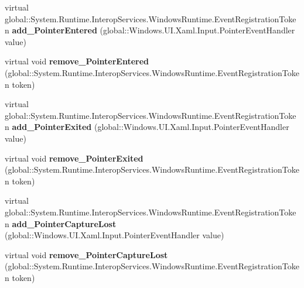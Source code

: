 \begin{DoxyCompactItemize}
\mbox{\label{class_windows_1_1_u_i_1_1_xaml_1_1_u_i_element_a62b58e40180ca9bf1db42ed2d6038c28}} 
virtual global\+::\+System.\+Runtime.\+Interop\+Services.\+Windows\+Runtime.\+Event\+Registration\+Token {\bfseries add\+\_\+\+Pointer\+Entered} (global\+::\+Windows.\+U\+I.\+Xaml.\+Input.\+Pointer\+Event\+Handler value)
\item 
\mbox{\label{class_windows_1_1_u_i_1_1_xaml_1_1_u_i_element_a7f81753f2c0c006e2fa7fc60206ef8fe}} 
virtual void {\bfseries remove\+\_\+\+Pointer\+Entered} (global\+::\+System.\+Runtime.\+Interop\+Services.\+Windows\+Runtime.\+Event\+Registration\+Token token)
\item 
\mbox{\label{class_windows_1_1_u_i_1_1_xaml_1_1_u_i_element_add2a4b911cb6783842ef779b81b58824}} 
virtual global\+::\+System.\+Runtime.\+Interop\+Services.\+Windows\+Runtime.\+Event\+Registration\+Token {\bfseries add\+\_\+\+Pointer\+Exited} (global\+::\+Windows.\+U\+I.\+Xaml.\+Input.\+Pointer\+Event\+Handler value)
\item 
\mbox{\label{class_windows_1_1_u_i_1_1_xaml_1_1_u_i_element_a0371add03a51f168e0d1456bdb3c1130}} 
virtual void {\bfseries remove\+\_\+\+Pointer\+Exited} (global\+::\+System.\+Runtime.\+Interop\+Services.\+Windows\+Runtime.\+Event\+Registration\+Token token)
\item 
\mbox{\label{class_windows_1_1_u_i_1_1_xaml_1_1_u_i_element_a66ebc4d8c8c99a7a0364051b341c48a6}} 
virtual global\+::\+System.\+Runtime.\+Interop\+Services.\+Windows\+Runtime.\+Event\+Registration\+Token {\bfseries add\+\_\+\+Pointer\+Capture\+Lost} (global\+::\+Windows.\+U\+I.\+Xaml.\+Input.\+Pointer\+Event\+Handler value)
\item 
\mbox{\label{class_windows_1_1_u_i_1_1_xaml_1_1_u_i_element_a4dc1dfa9d14ef2157a60a0da178c4784}} 
virtual void {\bfseries remove\+\_\+\+Pointer\+Capture\+Lost} (global\+::\+System.\+Runtime.\+Interop\+Services.\+Windows\+Runtime.\+Event\+Registration\+Token token)
\item 
\mbox{\label{class_windows_1_1_u_i_1_1_xaml_1_1_u_i_element_ae4cad3c4c84130d0d6362bc7aed7ba7d}} 

\end{DoxyCompactItemize}
